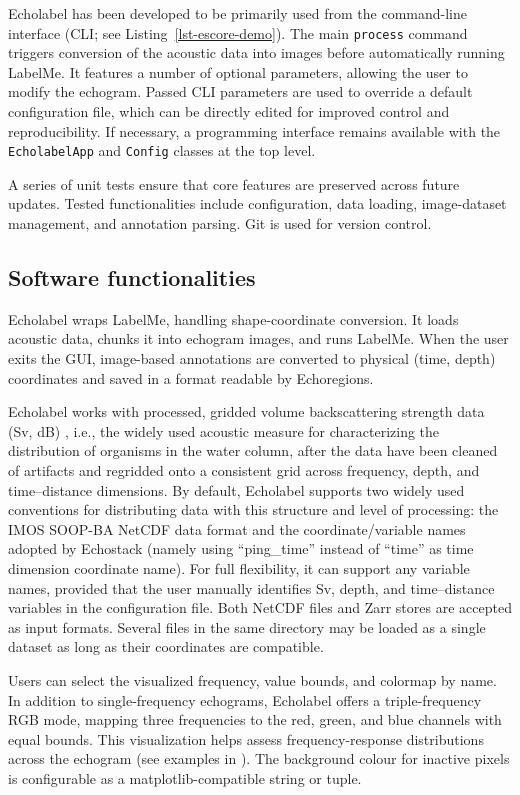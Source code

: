 \documentclass[
  number,
  preprint,
  3p]{elsarticle}
\begin{document}
Echolabel has been developed to be primarily used from the command-line
interface (CLI; see Listing~\ref{lst-escore-demo}). The main
\texttt{process} command triggers conversion of the acoustic data into
images before automatically running LabelMe. It features a number of
optional parameters, allowing the user to modify the echogram. Passed
CLI parameters are used to override a default configuration file, which
can be directly edited for improved control and reproducibility. If
necessary, a programming interface remains available with the
\texttt{EcholabelApp} and \texttt{Config} classes at the top level.

A series of unit tests ensure that core features are preserved across
future updates. Tested functionalities include configuration, data
loading, image-dataset management, and annotation parsing. Git is used
for version control.

\subsection{Software functionalities}\label{software-functionalities}

Echolabel wraps LabelMe, handling shape-coordinate conversion. It loads
acoustic data, chunks it into echogram images, and runs LabelMe. When
the user exits the GUI, image-based annotations are converted to
physical (time, depth) coordinates and saved in a format readable by
Echoregions.

Echolabel works with processed, gridded volume backscattering strength
data (Sv, dB) \citep{maclennan2002}, i.e., the widely used acoustic
measure for characterizing the distribution of organisms in the water
column, after the data have been cleaned of artifacts and regridded onto
a consistent grid across frequency, depth, and time--distance
dimensions. By default, Echolabel supports two widely used conventions
for distributing data with this structure and level of processing: the
IMOS SOOP-BA NetCDF data format \citep{kunnath2018} and the
coordinate/variable names adopted by Echostack (namely using
``ping\_time'' instead of ``time'' as time dimension coordinate name).
For full flexibility, it can support any variable names, provided that
the user manually identifies Sv, depth, and time--distance variables in
the configuration file. Both NetCDF files and Zarr stores are accepted
as input formats. Several files in the same directory may be loaded as a
single dataset as long as their coordinates are compatible.

Users can select the visualized frequency, value bounds, and colormap by
name. In addition to single-frequency echograms, Echolabel offers a
triple-frequency RGB mode, mapping three frequencies to the red, green,
and blue channels with equal bounds. This visualization helps assess
frequency-response distributions across the echogram (see examples in
\citep{ariza2022, annasawmy2019}). The background colour for inactive
pixels is configurable as a matplotlib-compatible string or tuple.
\end{document}
